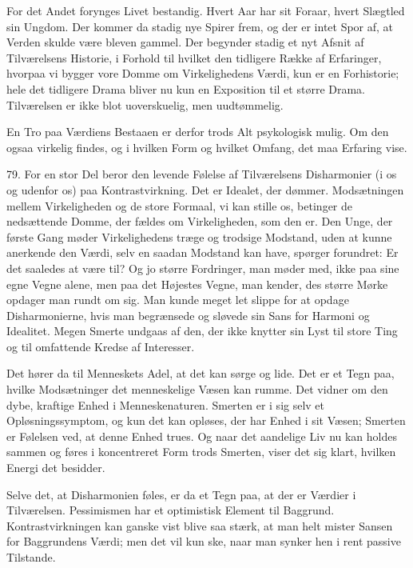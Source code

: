\documentclass[12pt,a4paper,openany]{book}
\newcommand{\opage}[1]{\marginnote{\footnotesize\textit{[#1]}}}
\begin{document}
For det Andet forynges Livet bestandig. Hvert Aar har sit Foraar, hvert
Slægtled sin Ungdom. Der kommer da stadig nye Spirer frem, og der er
intet Spor af, at Verden skulde være bleven gammel. Der begynder stadig
et nyt Afsnit af Tilværelsens Historie, i Forhold til hvilket den
tidligere Række af Erfaringer, hvorpaa vi bygger vore Domme om
Virkelighedens Værdi, kun er en Forhistorie; hele det tidligere Drama
bliver nu kun en Exposition til et større Drama. Tilværelsen er ikke
blot uoverskuelig, men uudtømmelig.

\opage{184}En Tro paa Værdiens Bestaaen er derfor trods Alt psykologisk
mulig. Om den ogsaa virkelig findes, og i hvilken Form og hvilket
Omfang, det maa Erfaring vise.

79. For en stor Del beror den levende Følelse af Tilværelsens
Disharmonier (i os og udenfor os) paa Kontrastvirkning. Det er Idealet,
der dømmer. Modsætningen mellem Virkeligheden og de store Formaal, vi
kan stille os, betinger de nedsættende Domme, der fældes om
Virkeligheden, som den er. Den Unge, der første Gang møder
Virkelighedens træge og trodsige Modstand, uden at kunne anerkende den
Værdi, selv en saadan Modstand kan have, spørger forundret: Er det
saaledes at være til? Og jo større Fordringer, man møder med, ikke paa
sine egne Vegne alene, men paa det Højestes Vegne, man kender, des
større Mørke opdager man rundt om sig. Man kunde meget let slippe for at
opdage Disharmonierne, hvis man begrænsede og sløvede sin Sans for
Harmoni og Idealitet. Megen Smerte undgaas af den, der ikke knytter sin
Lyst til store Ting og til omfattende Kredse af Interesser.

Det hører da til Menneskets Adel, at det kan sørge og lide. Det er et
Tegn paa, hvilke Modsætninger det menneskelige Væsen kan rumme. Det
vidner om den dybe, kraftige Enhed i Menneskenaturen. Smerten er i sig
selv et Opløsningssymptom, og kun det kan opløses, der har Enhed i sit
Væsen; Smerten er Følelsen ved, at denne Enhed trues. Og naar det
aandelige Liv nu kan holdes sammen og føres i koncentreret Form trods
Smerten, viser det sig klart, hvilken Energi det besidder.

Selve det, at Disharmonien føles, er da et Tegn paa, at der er Værdier i
Tilværelsen. Pessimismen har et optimistisk Element til Baggrund.
Kontrastvirkningen kan ganske vist blive saa stærk, at man helt mister
Sansen for Baggrundens Værdi; men det vil kun ske, naar man synker hen i
rent passive Tilstande.
\end{document}
